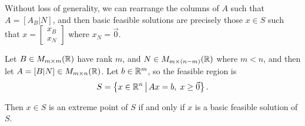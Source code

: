 \begin{rmk}
    Without loss of generality, we can rearrange the columns of $A$ such that $A = [A_B | N]$, and then basic feasible solutions are precisely those $x \in S$ such that $x = \begin{bmatrix}
        x_B \\ x_N
    \end{bmatrix}$ where $x_N = \vec{0}$.
\end{rmk}

\begin{thm}
    Let $B \in M_{m \times m}(\mathbb{R})$ have rank $m$, and $N \in M_{m \times (n-m)}(\mathbb{R})$ where $m < n$, and then let $A = [B | N] \in M_{m \times n}(\mathbb{R})$. Let $b \in \mathbb{R}^m$, so the feasible region is \[S = \left\{x \in \mathbb{R}^n \,\middle|\, Ax = b,\; x \geq \vec{0}\right\}.\]

    Then $x \in S$ is an extreme point of $S$ if and only if $x$ is a basic feasible solution of $S$.
\end{thm}

